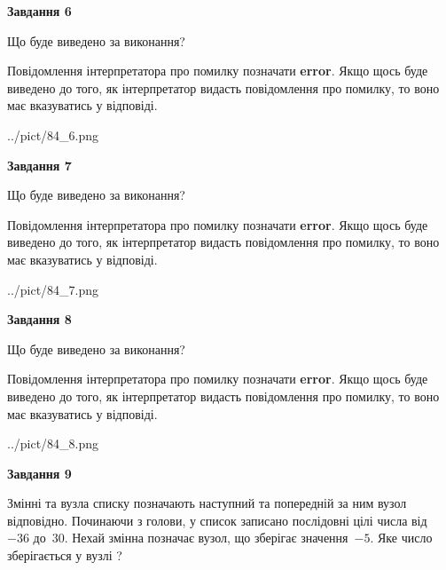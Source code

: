\documentclass[12pt, ukrainian]{article}
\begin{document}
{\begin {large}
{\begin {center}\textbf{Завдання 6}\end {center}}\par
Що буде виведено за виконання?

Повідомлення інтерпретатора про помилку позначати \textbf{error}.
Якщо щось буде виведено до того, як інтерпретатор видасть повідомлення про помилку, 
то воно має вказуватись у відповіді. \par


\begin{center}
	{../pict/84_6.png}
\end{center}
\newpage

{\begin {center}\textbf{Завдання 7}\end {center}}\par
Що буде виведено за виконання?

Повідомлення інтерпретатора про помилку позначати \textbf{error}.
Якщо щось буде виведено до того, як інтерпретатор видасть повідомлення про помилку, 
то воно має вказуватись у відповіді. \par


\begin{center}
	{../pict/84_7.png}
\end{center}
\newpage

{\begin {center}\textbf{Завдання 8}\end {center}}\par
Що буде виведено за виконання?

Повідомлення інтерпретатора про помилку позначати \textbf{error}.
Якщо щось буде виведено до того, як інтерпретатор видасть повідомлення про помилку, 
то воно має вказуватись у відповіді. \par


\begin{center}
	{../pict/84_8.png}
\end{center}
\newpage

{\begin {center}\textbf{Завдання 9}\end {center}}\par
Змінні  та  вузла списку позначають наступний та попередній за ним вузол відповідно. Починаючи з голови, у список записано послідовні цілі числа від~$-36$ до~$30$. Нехай змінна  позначає вузол, що зберігає значення~$-5$.
Яке число зберігається у вузлі  ?\par
\newpage


\end{large}}
\end{document}

